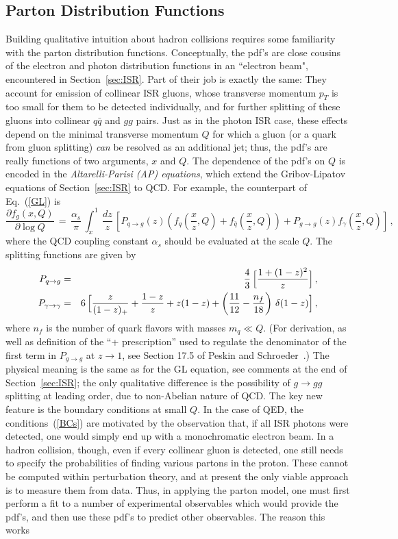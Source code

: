 \documentclass{ws-procs9x6}
\def\beq{\begin{equation}}
\def\eeq#1{\label{#1}\end{equation}}
\def\beqa{\begin{eqnarray}}
\def\eeqa#1{\label{#1}\end{eqnarray}}
\def\CR{\nonumber \\ }
\def\leqn#1{(\ref{#1})}
\begin{document}
\subsection{Parton Distribution Functions}

Building qualitative intuition about hadron collisions requires some familiarity with the parton distribution functions. Conceptually, the pdf's are 
close cousins of the electron and photon distribution functions in an ``electron beam", encountered in Section~\ref{sec:ISR}. Part of their job  is exactly the same: They account for emission of collinear ISR gluons, whose transverse momentum $p_T$ is too small for them to be detected individually, and for further splitting of these gluons into collinear $q\bar{q}$ and $gg$ pairs. Just as in the photon ISR case, these effects depend on the minimal transverse momentum $Q$ for which a gluon (or a quark from gluon splitting) {\it can} be resolved as an additional jet; thus, the pdf's are really functions of two arguments, $x$ and $Q$. The dependence of the pdf's on $Q$ is encoded in the {\it Altarelli-Parisi (AP) equations}, which extend the Gribov-Lipatov equations of Section~\ref{sec:ISR} to QCD. For example, the counterpart of Eq.~\leqn{GL} is
\beq
\frac{\partial f_g(x,Q)}{\partial\log Q}\,=\,\frac{\alpha_s}{\pi}\,
\int_x^1 \,\frac{dz}{z} \,\left[ P_{q\to g}(z) \left( f_{q}\left(\frac{x}{z},Q\right) + f_{\bar{q}}\left(\frac{x}{z},Q\right)\right)
+ P_{g\to g}(z) f_\gamma\left(\frac{x}{z},Q\right)\right]\,,
\eeq{AP}
where the QCD coupling constant $\alpha_s$ should be evaluated at the scale $Q$. The splitting functions are given by
\beqa
P_{q\to g} &=& \frac{4}{3}\,\Bigl[ \frac{1+(1-z)^2}{z}\Bigr] \,,\CR
P_{\gamma\to\gamma} &=& 6 \,\Bigl[ \frac{z}{(1-z)_+} + \frac{1-z}{z} + z(1-z) + \left(\frac{11}{12}-\frac{n_f}{18}\right)\,\delta(1-z) \Bigr]\,,
\eeqa{APsplit}
where $n_f$ is the number of quark flavors with masses $m_q \ll Q$. 
(For derivation, as well as definition of the ``+ prescription'' used to regulate the denominator of the first term in $P_{g\to g}$ at $z\to 1$, see Section 17.5 of Peskin and Schroeder~\cite{PS}.) 
The physical meaning is the same as for the GL equation, see comments at the end of Section~\ref{sec:ISR}; the only qualitative difference is the possibility of $g\to gg$ splitting at leading order, due to non-Abelian nature of QCD. The key new feature is the boundary conditions at small $Q$. In the case of QED, the conditions~\leqn{BCs} are motivated by the observation that, if all ISR photons were detected, one would simply end up with a monochromatic electron beam. In a hadron collision, though, even if every collinear gluon is detected, one still needs to specify the probabilities of finding various partons in the proton. These cannot be computed within perturbation theory, and at present the only viable approach is to measure them from data. Thus, in applying the parton model, one must first perform a fit to a number of experimental observables which would provide the pdf's, and then use these pdf's to predict other observables. The reason this works
\end{document}
